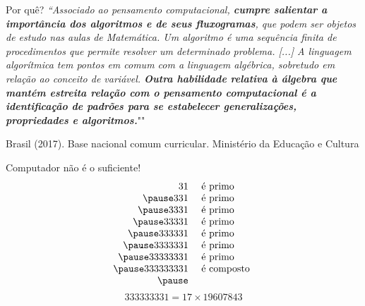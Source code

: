 \documentclass[12pt]{beamer}
\begin{document}
\begin{frame}{Por quê?}
\justifying
\textit{``Associado ao pensamento computacional,
\textbf{cumpre salientar a
importância dos algoritmos e de seus fluxogramas}, que podem
ser objetos de estudo nas aulas de Matemática. Um algoritmo é
uma sequência finita de procedimentos que permite resolver um
determinado problema. [...] A linguagem algorítmica
tem pontos em comum com a linguagem algébrica, sobretudo em
relação ao conceito de variável. \textbf{Outra habilidade
relativa à álgebra que mantém estreita relação com o
pensamento computacional é a identificação de padrões
para se estabelecer generalizações, propriedades
e algoritmos.}}""
\begin{flushright}
  Brasil (2017). Base nacional comum curricular. Ministério da Educação e Cultura
\end{flushright}
\end{frame}


\begin{frame}
  {Computador não é o suficiente!}
  \pause
  $$
  \begin{array}{rl}
  31 & \text{ é primo }  \\ \pause
  331 & \text{ é primo }  \\ \pause
  3331 & \text{ é primo }  \\ \pause
  33331 & \text{ é primo }  \\ \pause
  333331 & \text{ é primo }  \\ \pause
  3333331 & \text{ é primo }  \\ \pause
  33333331 & \text{ é primo }  \\ \pause
  333333331 & \text{ é composto }  \\ \pause
  \end{array}
  $$
  $$
    333333331 = 17 \times 19607843
  $$
\end{frame}
\end{document}
